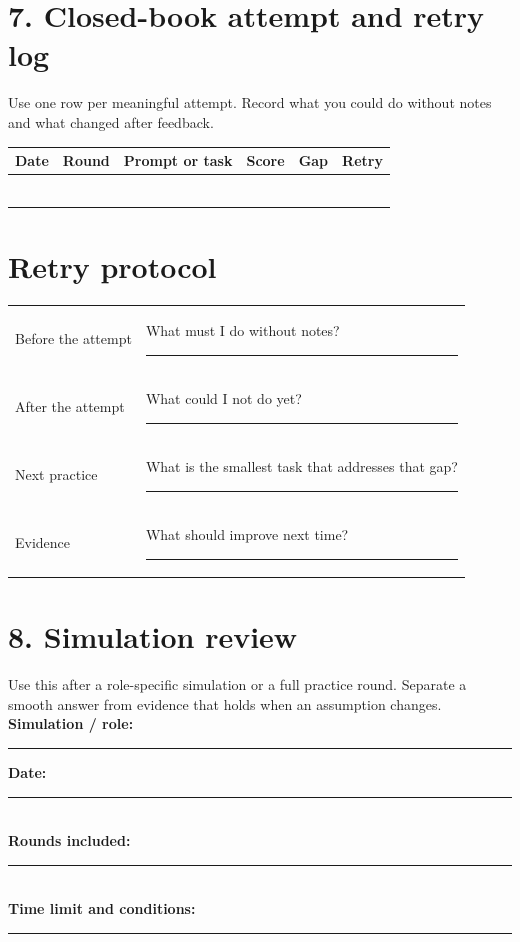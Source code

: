 \documentclass[10pt,letterpaper]{article}
\begin{document}
\newpage
\section*{7. Closed-book attempt and retry log}
Use one row per meaningful attempt. Record what you could do without notes and what changed after feedback.
\par
\vspace{.12in}
\renewcommand{\arraystretch}{1.55}
\begin{tabularx}{\linewidth}{@{}p{.12\linewidth} p{.18\linewidth} X p{.14\linewidth} p{.14\linewidth} p{.14\linewidth}@{}}
\toprule
Date & Round & Prompt or task & Score & Gap & Retry \\
\midrule
\rule{0pt}{.45in} & & & & & \\
\midrule
\rule{0pt}{.45in} & & & & & \\
\midrule
\rule{0pt}{.45in} & & & & & \\
\midrule
\rule{0pt}{.45in} & & & & & \\
\midrule
\rule{0pt}{.45in} & & & & & \\
\midrule
\rule{0pt}{.45in} & & & & & \\
\bottomrule
\end{tabularx}

\section*{Retry protocol}
\begin{tabularx}{\linewidth}{@{}p{.27\linewidth} X@{}}
\toprule
Before the attempt & What must I do without notes? \rule{.45\hsize}{.35pt}\\[.45em]
After the attempt & What could I not do yet? \rule{.35\hsize}{.35pt}\\[.45em]
Next practice & What is the smallest task that addresses that gap? \rule{.32\hsize}{.35pt}\\[.45em]
Evidence & What should improve next time? \rule{.32\hsize}{.35pt}\\
\bottomrule
\end{tabularx}

\newpage
\section*{8. Simulation review}
Use this after a role-specific simulation or a full practice round. Separate a smooth answer from evidence that holds when an assumption changes.
\vspace{.1in}
\textbf{Simulation / role:} \rule{.45\linewidth}{.35pt}\hfill \textbf{Date:} \rule{.15\linewidth}{.35pt}\\[.55em]
\textbf{Rounds included:} \rule{.72\linewidth}{.35pt}\\[.55em]
\textbf{Time limit and conditions:} \rule{.58\linewidth}{.35pt}\\[.55em]
\end{document}
